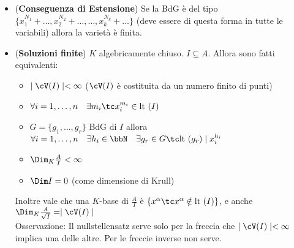 \documentclass[a4paper,NoNotes,GeneralMath]{stdmdoc}
\newcommand{\Lt}{\text{lt }}
\begin{document}
\begin{itemize}
\begin{itemize}
				\item ({\bf Conseguenza di Estensione}) Se la BdG è del tipo $\{x_1^{N_1} + \ldots, x_2^{N_2} + \ldots, \ldots, x_k^{N_k} + \ldots \}$ (deve essere di questa forma in tutte le variabili) allora la varietà è finita.
				\item ({\bf Soluzioni finite}) $K$ algebricamente chiuso. $I \subseteq A$. Allora sono fatti equivalenti:
					\begin{itemize}
						\item $\mid \cV(I) \mid < \infty$ ($\cV(I)$ è costituita da un numero finito di punti)
						\item $\forall i = 1, \ldots, n \quad \exists m_i \tc x_i^{m_i} \in \Lt(I)$
						\item $G = \{ g_1, \ldots, g_r\}$ BdG di $I$ allora $\forall i = 1, \ldots, n \quad \exists h_i \in \bbN \quad \exists g_r \in G \tc \Lt(g_r) \mid x_i^{h_i}$
						\item $\Dim_K \frac{A}{I} < \infty$
						\item $\Dim I = 0$ (come dimensione di Krull)
					\end{itemize}
					Inoltre vale che una $K$-base di $\frac{A}{I}$ è $\{x^\alpha \tc x^\alpha \notin \Lt(I)\}$, e anche $\Dim_K \frac{A}{\sqrt{I}} = \mid \cV(I) \mid$ \\
					Osservazione: Il nullstellensatz serve solo per la freccia che $\mid \cV(I) \mid < \infty$ implica una delle altre. Per le freccie inverse non serve.
			\end{itemize}
	\end{itemize}
	
\end{document}
